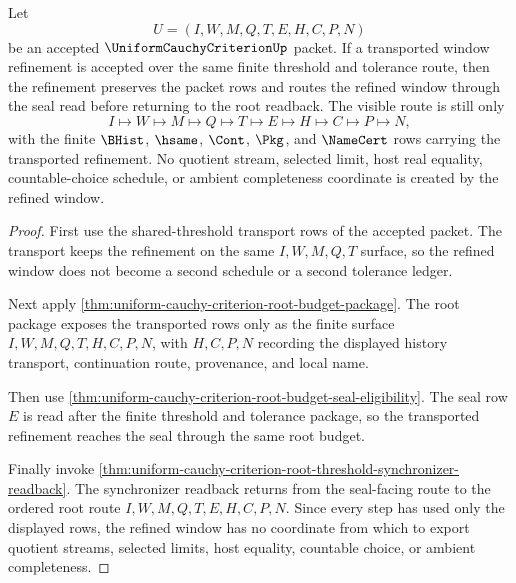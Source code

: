 \begin{theorem}
\label{thm:uniform-cauchy-criterion-window-refinement-seal-route}
Let
$$
U=(I,W,M,Q,T,E,H,C,P,N)
$$
be an accepted $\UniformCauchyCriterionUp$ packet. If a transported window
refinement is accepted over the same finite threshold and tolerance route, then
the refinement preserves the packet rows and routes the refined window through
the seal read before returning to the root readback. The visible route is still
only
$$
I \longmapsto W \longmapsto M \longmapsto Q \longmapsto T \longmapsto E
\longmapsto H \longmapsto C \longmapsto P \longmapsto N,
$$
with the finite $\BHist$, $\hsame$, $\Cont$, $\Pkg$, and $\NameCert$ rows
carrying the transported refinement. No quotient stream, selected limit, host
real equality, countable-choice schedule, or ambient completeness coordinate is
created by the refined window.
\end{theorem}
\begin{proof}
First use the shared-threshold transport rows of the accepted packet. The
transport keeps the refinement on the same $I,W,M,Q,T$ surface, so the refined
window does not become a second schedule or a second tolerance ledger.

Next apply \autoref{thm:uniform-cauchy-criterion-root-budget-package}. The
root package exposes the transported rows only as the finite surface
$I,W,M,Q,T,H,C,P,N$, with $H,C,P,N$ recording the displayed history transport,
continuation route, provenance, and local name.

Then use \autoref{thm:uniform-cauchy-criterion-root-budget-seal-eligibility}.
The seal row $E$ is read after the finite threshold and tolerance package, so
the transported refinement reaches the seal through the same root budget.

Finally invoke
\autoref{thm:uniform-cauchy-criterion-root-threshold-synchronizer-readback}.
The synchronizer readback returns from the seal-facing route to the ordered
root route $I,W,M,Q,T,E,H,C,P,N$. Since every step has used only the displayed
rows, the refined window has no coordinate from which to export quotient
streams, selected limits, host equality, countable choice, or ambient
completeness.
\end{proof}

